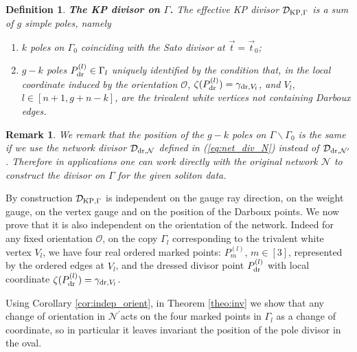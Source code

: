 \documentclass[11pt]{amsart}
\theoremstyle{plain}
\numberwithin{equation}{section}
\newtheorem{remark}{Remark}[subsection]
\newtheorem{definition}{Definition}[subsection]
\def \DKP {{\mathcal D}_{\textup{\scriptsize KP},\Gamma}}
\def \DDN {{\mathcal D}_{\textup{\scriptsize dr},{\mathcal N}^{\prime}}}
\begin{document}
\begin{definition}\label{def:DKP}{\textbf{The KP divisor on  $\Gamma$.}} The effective KP divisor $\DKP$ is a sum of $g$ simple poles, namely 
\begin{enumerate}
\item $k$ poles on $\Gamma_0$ coinciding with the Sato divisor at $\vec t= \vec t_0$;
\item $g-k$ poles $P_{\textup{\scriptsize dr}}^{(l)}\in \Gamma_l$ uniquely identified by the condition that, in the local coordinate induced by the orientation $\mathcal O$, $\zeta(P_{\textup{\scriptsize dr}}^{(l)}) =\gamma_{\textup{\scriptsize dr}, V_l}$,
and $V_l$, $l\in [n+1,g+n-k]$, are the trivalent white vertices not containing Darboux edges. 
\end{enumerate}
\end{definition}

\begin{remark} 
We remark that the position of the $g-k$ poles on $\Gamma\backslash \Gamma_0$ is the same if we use the network divisor ${\mathcal D}_{\textup{\scriptsize dr},{\mathcal N}}$  defined in (\ref{eq:net_div_N}) instead of $\DDN$. Therefore in applications one can work directly with the original network $\mathcal N$ to construct the divisor on $\Gamma$ for the given soliton data.
\end{remark}

By construction $\DKP$ is independent on the gauge ray direction, on the weight gauge, on the vertex gauge and on the position of the Darboux points. We now prove that it is also independent on the orientation of the network.
Indeed for any fixed orientation $\mathcal O$, on the copy $\Gamma_l$ corresponding to the trivalent white vertex $V_l$, we have four real ordered marked points: $P_m^{(l)}$, $m\in [3]$, represented by the ordered edges at $V_l$, and the dressed divisor point $P_{\textup{\scriptsize dr}}^{(l)}$ with local coordinate $\zeta(P_{\textup{\scriptsize dr}}^{(l)})=\gamma_{\textup{\scriptsize dr}, V_l}$.

Using Corollary \ref{cor:indep_orient}, in Theorem \ref{theo:inv} we show that any change of orientation in $\mathcal N^{\prime}$acts on the four marked points in $\Gamma_l$ as a change of coordinate, so in particular it leaves invariant the position of the pole divisor in the oval.
\end{document}

